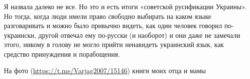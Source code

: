 Я назвала далеко не все. Но это и есть итоги «советской русификации Украины».
Но тогда, когда люди имели право свободно выбирать на каком языке разговаривать
и можно было привычно видеть, как один человек говорил по-украински, другой
отвечал ему по-русски (и наоборот) и они даже не замечали этого, никому в
голову не могло прийти ненавидеть украинский язык, как средство принуждения и
порабощения.

На фото (\url{https://t.me/Varjag2007/15146})  книги моих отца и мамы
